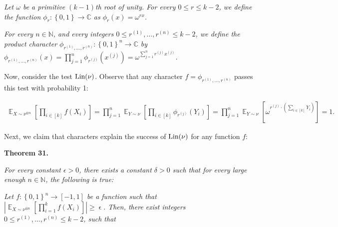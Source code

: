 \documentclass[10pt,a4paper]{article}
\begin{document}
\emph{Let $\omega$ be a primitive $(k-1)$th root of unity.
For every $0\leqslant r\leqslant k-2$, we define the function $\phi_{r}:\left\{0,1\right\}\to\mathbb{C}$ as $\phi_{r}(x)=\omega^{rx}$.}\par




\emph{For every $n\in\mathbb{N}$, and every integers $0\leqslant r^{\left(1\right)},\dots,r^{\left(n\right)}\leqslant k-2$, we define the product character $\phi_{r^{\left(1\right)},\dots,r^{\left(n\right)}}:\left\{0,1\right\}^{n}\to\mathbb{C}$ by $\phi_{r^{\left(1\right)},\dots,r^{\left(n\right)}}(x)=\prod_{j=1}^{n}\phi_{r^{\left(j\right)}}(x^{\left(j\right)})=\omega^{\sum_{j=1}^{n}r^{\left(j\right)}x^{\left(j\right)}}$.}\par






Now, consider the test $\textnormal{Lin}(\nu)$.
Observe that any character $f=\phi_{r^{\left(1\right)},\dots,r^{\left(n\right)}}$ passes this test with probability 1:\par


\[\begin{gathered}
\mathop{\mathbb{E}}_{X\sim\nu^{\otimes n}}\left[\prod_{i\in[k]}f(X_{i})\right]=\prod_{j=1}^{n}\mathop{\mathbb{E}}_{Y\sim\nu}\left[\prod_{i\in[k]}\phi_{r^{\left(j\right)}}(Y_{i})\right]=\prod_{j=1}^{n}\mathop{\mathbb{E}}_{Y\sim\nu}\left[\omega^{r^{\left(j\right)}\cdot\left(\sum_{i\in[k]}{Y_{i}}\right)}\right]=1.
\end{gathered}\]


Next, we claim that characters explain the success of $\textnormal{Lin}(\nu)$ for any function $f$:\par





\par\medskip\noindent\textbf{
\textbf{Theorem 31}\textbf{.}
}\par



\emph{For every constant $\epsilon>0$, there exists a constant $\delta>0$ such that for every large enough $n\in\mathbb{N}$, the following is true:}\par




\emph{Let $f:\left\{0,1\right\}^{n}\to[-1,1]$ be a function such that $\left|\mathop{\mathbb{E}}_{X\sim\nu^{\otimes n}}\left[\prod_{i=1}^{k}f(X_{i})\right]\right|\geqslant\mathop{\epsilon}.$
Then, there exist integers $0\leqslant r^{\left(1\right)},\dots,r^{\left(n\right)}\leqslant k-2$, such that}\par
\end{document}
